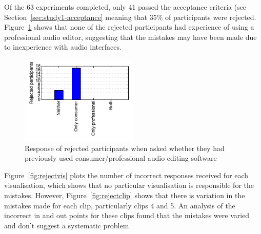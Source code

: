 Of the 63 experiments completed, only 41 passed the acceptance criteria (see Section~\ref{sec:study1-acceptance}
meaning that 35\% of participants were rejected. Figure~\ref{fig:rejectdaw} shows that none of the rejected
participants had experience of using a professional audio editor, suggesting that the mistakes may have been made due
to inexperience with audio interfaces.

\begin{figure}[ht]
  \centering
  \includegraphics[width=0.5\textwidth]{figs/reject-daw.pdf}
  \caption{Response of rejected participants when asked whether they had previously used consumer/professional audio
    editing software}
  \label{fig:rejectdaw}
\end{figure}

Figure~\ref{fig:rejectvis} plots the number of incorrect responses received for each visualisation, which shows that no
particular visualisation is responsible for the mistakes. However, Figure~\ref{fig:rejectclip} shows that there is
variation in the mistakes made for each clip, particularly clips 4 and 5. An analysis of the incorrect in and out
points for these clips found that the mistakes were varied and don't suggest a systematic problem. 

